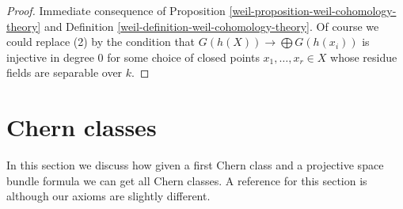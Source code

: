 \begin{proof}

Immediate consequence of Proposition \ref{weil-proposition-weil-cohomology-theory}
and Definition \ref{weil-definition-weil-cohomology-theory}. Of course we could
replace (2) by the condition that $G(h(X)) \to \bigoplus G(h(x_i))$
is injective in degree $0$ for some choice of closed points
$x_1, \ldots, x_r \in X$ whose residue fields are separable over $k$.
\end{proof}

\section{Chern classes}
\label{weil-section-chern}
In this section we discuss how given a first Chern class and a projective
space bundle formula we can get all Chern classes.
A reference for this section is \cite{Grothendieck-chern} although our
axioms are slightly different.

